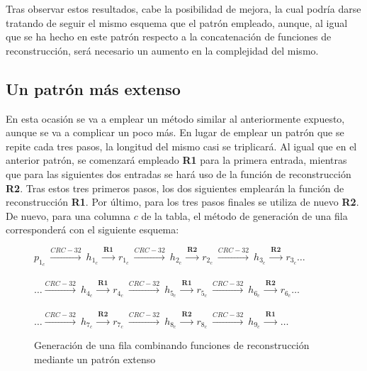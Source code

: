 \documentclass[12pt,spanish,listoffigures,listoftables,listofalgorithms]{tfgetsinf}
\begin{document}
Tras observar estos resultados, cabe la posibilidad de mejora, la cual podría darse tratando de seguir el mismo esquema que el patrón empleado, aunque, al igual que se ha hecho en este patrón respecto a la concatenación de funciones de reconstrucción, será necesario un aumento en la complejidad del mismo.

\subsection{Un patrón más extenso}

En esta ocasión se va a emplear un método similar al anteriormente expuesto, aunque se va a complicar un poco más. En lugar de emplear un patrón que se repite cada tres pasos, la longitud del mismo casi se triplicará. Al igual que en el anterior patrón, se comenzará empleado \textbf{R1} para la primera entrada, mientras que para las siguientes dos entradas se hará uso de la función de reconstrucción \textbf{R2}. Tras estos tres primeros pasos, los dos siguientes emplearán la función de reconstrucción \textbf{R1}. Por último, para los tres pasos finales se utiliza de nuevo \textbf{R2}. De nuevo, para una columna $c$ de la tabla, el método de generación de una fila corresponderá con el siguiente esquema:

\begin{figure}[H]
	
	\centering

	$p_{1_c}~ \xrightarrow{CRC-32}~ h_{1_c}~ \xrightarrow{\textbf{R1}}~ r_{1_c}~ \xrightarrow{CRC-32}~ h_{2_c}~ \xrightarrow{\textbf{R2}}~ r_{2_c}~ \xrightarrow{CRC-32}~ h_{3_c}~ \xrightarrow{\textbf{R2}}~ r_{3_c} \dots$ \\
	~\\
	$\dots \xrightarrow{CRC-32}~ h_{4_c}~ \xrightarrow{\textbf{R1}}~ r_{4_c}~ \xrightarrow{CRC-32}~ h_{5_c}~ \xrightarrow{\textbf{R1}}~ r_{5_c}~ \xrightarrow{CRC-32}~ h_{6_c}~ \xrightarrow{\textbf{R2}}~ r_{6_c} \dots$ \\
	~\\
	$\dots \xrightarrow{CRC-32}~ h_{7_c}~ \xrightarrow{\textbf{R2}}~ r_{7_c}~ \xrightarrow{CRC-32}~ h_{8_c}~ \xrightarrow{\textbf{R2}}~ r_{8_c}~ \xrightarrow{CRC-32}~ h_{9_c}~\xrightarrow{\textbf{R1}}~ \dots$\;\;\;\; \\

	\caption{Generación de una fila combinando funciones de reconstrucción mediante un patrón extenso}
	\label{filaPG}

\end{figure}
\end{document}
